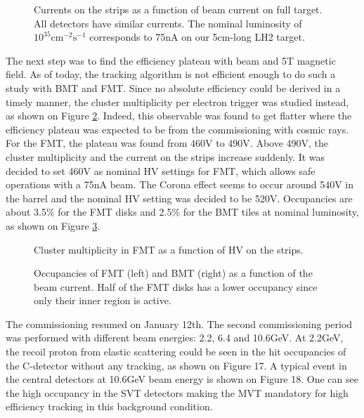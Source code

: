 \begin{figure}[htb]
 \caption{Currents on the strips as a function of beam current on full target. All detectors have similar currents. The nominal luminosity of $10^{35}\text{cm}^{-2}\text{s}^{-1}$ corresponds to 75nA on our 5cm-long LH2 target.}
 \label{fig:mm-fig14}
\end{figure}

The next step was to find the efficiency plateau with beam and 5T magnetic field. As of today, the tracking algorithm is not efficient enough to do such a study with BMT and FMT. Since no absolute efficiency could be derived in a timely manner, the cluster multiplicity per electron trigger was studied instead, as shown on Figure \ref{fig:mm-fig15}. Indeed, this observable was found to get flatter where the efficiency plateau was expected to be from the commissioning with cosmic rays.  For the FMT, the plateau was found from 460V to 490V. Above 490V, the cluster multiplicity and the current on the strips increase suddenly. It was decided to set 460V as nominal HV settings for FMT, which allows safe operations with a 75nA beam. The Corona effect seems to occur around 540V in the barrel and the nominal HV setting was decided to be 520V.  Occupancies are about 3.5\% for the FMT disks and 2.5\% for the BMT tiles at nominal luminosity, as shown on Figure \ref{fig:mm-fig16}.


\begin{figure}[htb]
 \caption{Cluster multiplicity in FMT as a function of HV on the strips.}
 \label{fig:mm-fig15}
\end{figure}


\begin{figure}[htb]
 \caption{Occupancies of FMT (left) and BMT (right) as a function of the beam current. Half of the FMT disks has a lower occupancy since only their inner region is active.}
 \label{fig:mm-fig16}
\end{figure}

The commissioning resumed on January 12th.  The second commissioning period was performed with different beam energies: 2.2, 6.4 and 10.6GeV. At 2.2GeV, the recoil proton from elastic scattering could be seen in the hit occupancies of the C-detector without any tracking, as shown on Figure 17. A typical event in the central detectors at 10.6GeV beam energy is shown on Figure 18. One can see the high occupancy in the SVT detectors making the MVT mandatory for high efficiency tracking in this background condition.



